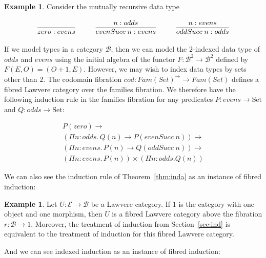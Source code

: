\documentclass{LMCS}
\makeatletter
\newcommand{\ra}{\rightarrow}
\newcommand{\Set}{\mbox{Set}}
\newcommand{\proofrule}[2]{\ensuremath{
  \begin{array}[t]{@{}c@{}}
    \begin{array}[t]{lllll} 
      #1
    \end{array}\\
  \hline 
     #2
  \end{array}}}
\newcommand\E{{\mathcal E}}
\newcommand\B{{\mathcal B}}
\theoremstyle{plain}
\theoremstyle{remark}
\theoremstyle{definition}
\newtheorem{example}[theorem]{Example}
\makeatother
\begin{document}
\begin{example}
Consider the mutually recursive data type

\vspace*{-0.05in}

\[\proofrule{}
             {zero : evens }
\hspace{1cm}
\proofrule{ n : odds}
          {evenSucc \; n : evens}
\hspace{1cm}
\proofrule{ n : evens }
          {oddSucc \; n : odds }
\]

\vspace*{0.1in}

\noindent
If we model types in a category $\B$, then we can model the
$2$-indexed data type of $odds$ and $evens$ using the initial algebra
of the functor $F : \B^2 \ra \B^2$ defined by $F(E,O) = (O+1,E)$.
However, we may wish to index data types by sets other than $2$.
The codomain fibration $cod:Fam(Set)^\ra \ra Fam(Set)$ defines a
fibred Lawvere category over the families fibration.  We therefore
have the following induction rule in the families fibration for any
predicates $P:evens \ra \Set$ and $Q: odds \ra \Set$:

\[\begin{array}{l}
P(zero) \rightarrow\\
(\Pi n : odds. \,Q(n) \rightarrow P(evenSucc \; n)) \ra \\
(\Pi n : evens. \,P(n) \rightarrow Q(oddSucc\; n)) \ra \\
(\Pi n : evens. \,P(n)) \times (\Pi n : odds. Q(n))
\end{array}
\]
\end{example}

\vspace*{0.1in}

We can also see the induction rule of Theorem~\ref{thm:inda} as an
instance of fibred induction:

\begin{example}\label{ex:sec2}
  Let $U:\E \ra \B$ be a Lawvere category. If $1$ is the category with
  one object and one morphism, then $U$ is a fibred Lawvere category
  above the fibration $r :\B \ra 1$. Moreover, the treatment of
  induction from Section~\ref{sec:ind} is equivalent to the treatment
  of induction for this fibred Lawvere category.
\end{example}

And we can see indexed induction as an instance of fibred induction:
\end{document}
